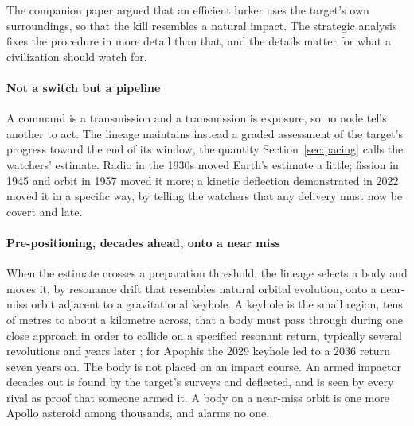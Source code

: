 \documentclass[preprint,12pt]{elsarticle}
\theoremstyle{definition}
\begin{document}
The companion paper argued that an efficient lurker uses the target's own surroundings, so that the kill resembles a natural impact. The strategic analysis fixes the procedure in more detail than that, and the details matter for what a civilization should watch for.

\paragraph{Not a switch but a pipeline} A command is a transmission and a transmission is exposure, so no node tells another to act. The lineage maintains instead a graded assessment of the target's progress toward the end of its window, the quantity Section~\ref{sec:pacing} calls the watchers' estimate. Radio in the 1930s moved Earth's estimate a little; fission in 1945 and orbit in 1957 moved it more; a kinetic deflection demonstrated in 2022 \citep{Daly2023} moved it in a specific way, by telling the watchers that any delivery must now be covert and late.

\paragraph{Pre-positioning, decades ahead, onto a near miss} When the estimate crosses a preparation threshold, the lineage selects a body and moves it, by resonance drift that resembles natural orbital evolution, onto a near-miss orbit adjacent to a gravitational keyhole. A keyhole is the small region, tens of metres to about a kilometre across, that a body must pass through during one close approach in order to collide on a specified resonant return, typically several revolutions and years later \citep{Valsecchi2003,Chesley2006}; for Apophis the 2029 keyhole led to a 2036 return seven years on. The body is not placed on an impact course. An armed impactor decades out is found by the target's surveys and deflected, and is seen by every rival as proof that someone armed it. A body on a near-miss orbit is one more Apollo asteroid among thousands, and alarms no one.
\end{document}
